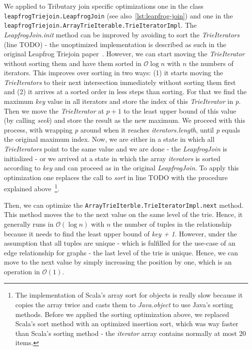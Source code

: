 We applied to Tributary join specific optimizations one in the class \texttt{leapfrogTriejoin.LeapfrogJoin} (see also~\cref{lst:leapfrog-join}) and one
in the \texttt{leapfrogTriejoin.ArrayTrieIterable.TrieIteratorImpl}.
The \textit{LeapfrogJoin.init} method can be improved by avoiding to sort the \textit{TrieIterators} (line TODO)  %
- the unoptimized implementation is described as such in the original Leapfrog Triejoin paper~\cite{leapfrog}.
However, we can start moving the \textit{TrieIterator} without sorting them and have them sorted in $\mathcal{O} \log n$ with $n$ the numbers of iterators.
This improves over sorting in two ways: (1) it starts moving the \textit{TrieIterators} to their next intersection immediately without sorting them first and
(2) it arrives at a sorted order in less steps than sorting.
For that we find the maximum \textit{key} value in all iterators and store the index of this \textit{TrieIterator} in \textit{p}.
Then we move the \textit{TrieIterator} at $p + 1$ to the least upper bound of this value (by calling \textit{seek}) and store the result as the new maximum.
We proceed with this process, with wrapping \textit{p} around when it reaches \textit{iterators.length}, until \textit{p} equals the original maximum index.
Now, we are either in a state in which all \textit{TrieIterators} point to the same value and we are done - the \textit{LeapfrogJoin} is initialized -
or we arrived at a state in which the array \textit{iterators} is sorted according to \textit{key} and can proceed as in the original \textit{LeapfrogJoin}.
To apply this optimization one replaces the call to \textit{sort} in line TODO with the procedure explained above~\footnote{The implementation of Scala's array sort for objects is really
slow because it copies the array twice and casts them to \textit{Java.object} to use Java's sorting methods. Before we applied the sorting optimization above, we replaced Scala's sort
method with an optimized insertion sort, which was way faster than Scala's sorting method - the \textit{iterator} array contains normally at most 20 items.}.

Then, we can optimize the \texttt{ArrayTrieIterble.TrieIteratorImpl.next} method.
This method moves the to the next value on the same level of the trie.
Hence, it generally runs in $\mathcal{O} (\log n)$ with $n$ the number of tuples in the relationship because it needs to find the least upper bound of \textit{key + 1}.
However, under the assumption that all tuples are unique - which is fulfilled for the use-case of an edge relationship for graphs - the last level of the trie
is unique.
Hence, we can move to the next value by simply increasing the position by one, which is an operation in $\mathcal{O} (1)$.

